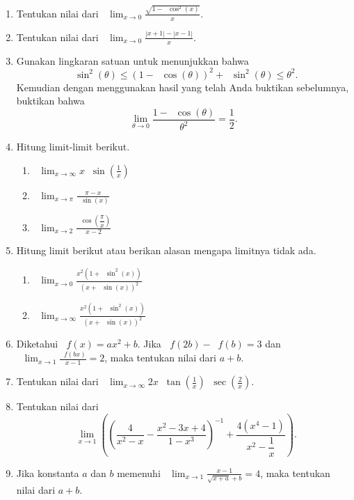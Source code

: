 \documentclass[12pt]{article}
\newcommand*\func[2]{\mathop{}\!{#1}{\left({#2}\right)}}
\newcommand*\ds[1]{\mathop{}\!\displaystyle{{#1}}}
\begin{document}
	\begin{enumerate}[leftmargin=*]
		\item Tentukan nilai dari $ \ds{\lim_{x \to 0}{\frac{\sqrt{1 - \func{\cos^{2}}{x}}}{x}}} $.
		\item Tentukan nilai dari $ \ds{\lim_{x \to 0}{\frac{\left|x + 1\right| - \left|x - 1\right|}{x}}} $.
		\item Gunakan lingkaran satuan untuk menunjukkan bahwa
		\[ \func{\sin^{2}}{\theta} \leq \left(1 - \func{\cos}{\theta}\right)^{2} + \func{\sin^{2}}{\theta} \leq \theta^{2}. \]
		Kemudian dengan menggunakan hasil yang telah Anda buktikan sebelumnya, buktikan bahwa
		\[ \lim_{\theta \to 0}{\frac{1 - \func{\cos}{\theta}}{\theta^{2}}} = \frac{1}{2}. \]
		\item Hitung limit-limit berikut.
		\begin{enumerate}
			\item $ \ds{\lim_{x \to \infty}{x\func{\sin}{\frac{1}{x}}}} $
			\item $ \ds{\lim_{x \to \pi}{\frac{\pi - x}{\func{\sin}{x}}}} $
			\item $ \ds{\lim_{x \to 2}{\frac{\func{\cos}{\dfrac{\pi}{x}}}{x - 2}}} $
		\end{enumerate}
		\item Hitung limit berikut atau berikan alasan mengapa limitnya tidak ada.
		\begin{enumerate}
			\item $ \ds{\lim_{x \to 0}{\frac{x^{2}\left(1 + \func{\sin^{2}}{x}\right)}{\left(x + \func{\sin}{x}\right)^{2}}}} $
			\item $ \ds{\lim_{x \to \infty}{\frac{x^{2}\left(1 + \func{\sin^{2}}{x}\right)}{\left(x + \func{\sin}{x}\right)^{2}}}} $
		\end{enumerate}
		\item Diketahui $ \func{f}{x} = ax^{2} + b $. Jika $ \func{f}{2b} - \func{f}{b} = 3 $ dan $ \ds{\lim_{x \to 1}{\frac{\func{f}{bx}}{x - 1}}} = 2 $, maka tentukan nilai dari $ a + b $.
		\item Tentukan nilai dari $ \ds{\lim_{x \to \infty}{2x\func{\tan}{\frac{1}{x}}\func{\sec}{\frac{2}{x}}}} $.
		\item Tentukan nilai dari
		\[ \func{\lim_{x \to 1}}{\left(\frac{4}{x^{2} - x} - \frac{x^{2} - 3x + 4}{1 - x^{3}}\right)^{-1} + \frac{4\left(x^{4} - 1\right)}{x^{2} - \dfrac{1}{x}}}. \]
		\item Jika konstanta $ a $ dan $ b $ memenuhi $ \ds{\lim_{x \to 1}{\frac{x - 1}{\sqrt{x + a} + b}}} = 4 $, maka tentukan nilai dari $ a + b $.

\end{enumerate}
\end{document}
